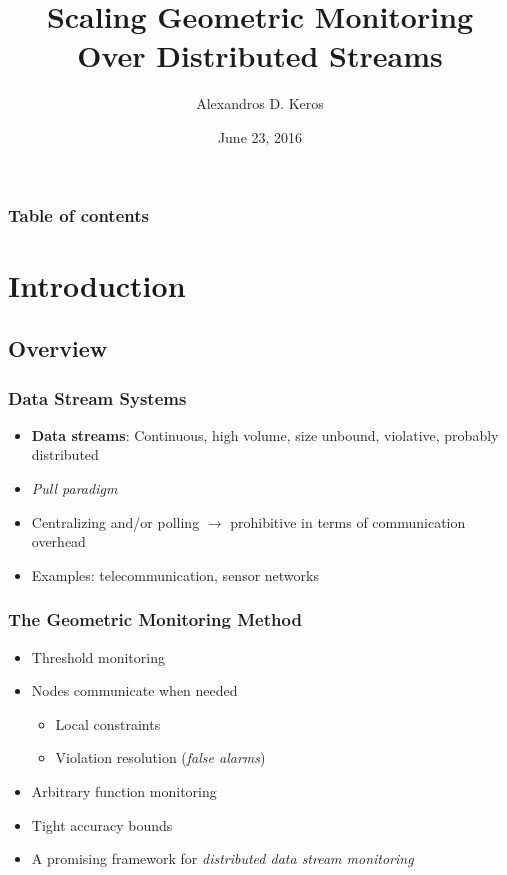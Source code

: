 \documentclass[hyperref={pdfpagelabels=false}]{beamer}
\title{Scaling Geometric Monitoring Over Distributed Streams}
\author{Alexandros D. Keros}
\date{June 23, 2016}
\begin{document}
\begin{frame}
\titlepage
\end{frame} 


\begin{frame}
\frametitle{Table of contents}
\tableofcontents
\end{frame} 

\section{Introduction}
\begin{frame}
  \tableofcontents[currentsection]
 \end{frame}
 
\subsection*{Overview}
\begin{frame} \frametitle{Data Stream Systems}%
\begin{itemize}
\item \textbf{Data streams}: Continuous, high volume, size unbound, violative, probably distributed
\item \emph{Pull paradigm}
\item Centralizing and/or polling $\rightarrow$ prohibitive in terms of communication overhead
\item Examples: telecommunication, sensor networks 
\end{itemize}
\end{frame}

\begin{frame} \frametitle{The Geometric Monitoring Method}%
\begin{itemize}
\item Threshold monitoring
\item Nodes communicate when needed
	\begin{itemize}
	\item Local constraints
	\item Violation resolution (\emph{false alarms})
	\end{itemize}
\item Arbitrary function monitoring
\item Tight accuracy bounds
\item A promising framework for \emph{distributed data stream monitoring}
\end{itemize}
\end{frame}
\end{document}

